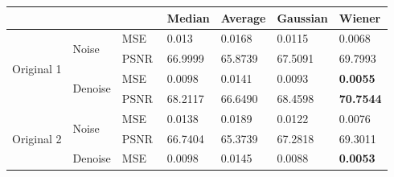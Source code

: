 \begin{center}
\begin{tabular}{llllllllllll|l|l|l|l|l|l|l|l|l|l|l|l|l|}
\cline{13-25}
           &            &            &            &            &            &          &          &       &      &      &     & \multicolumn{3}{l|}{Median}  & \multicolumn{3}{l|}{Average} & \multicolumn{4}{l|}{Gaussian} & \multicolumn{3}{l|}{Wiener}           \\ \hline
\multicolumn{4}{|l|}{\multirow{4}{*}{Original 1}} & \multicolumn{4}{l|}{\multirow{2}{*}{Noise}}   & \multicolumn{4}{l|}{MSE}  & \multicolumn{3}{l|}{0.013}   & \multicolumn{3}{l|}{0.0168}  & \multicolumn{4}{l|}{0.0115}   & \multicolumn{3}{l|}{0.0068}           \\ \cline{9-25} 
\multicolumn{4}{|l|}{}                            & \multicolumn{4}{l|}{}                         & \multicolumn{4}{l|}{PSNR} & \multicolumn{3}{l|}{66.9999} & \multicolumn{3}{l|}{65.8739} & \multicolumn{4}{l|}{67.5091}  & \multicolumn{3}{l|}{69.7993}          \\ \cline{5-25} 
\multicolumn{4}{|l|}{}                            & \multicolumn{4}{l|}{\multirow{2}{*}{Denoise}} & \multicolumn{4}{l|}{MSE}  & \multicolumn{3}{l|}{0.0098}  & \multicolumn{3}{l|}{0.0141}  & \multicolumn{4}{l|}{0.0093}   & \multicolumn{3}{l|}{\textbf{0.0055}}  \\ \cline{9-25} 
\multicolumn{4}{|l|}{}                            & \multicolumn{4}{l|}{}                         & \multicolumn{4}{l|}{PSNR} & \multicolumn{3}{l|}{68.2117} & \multicolumn{3}{l|}{66.6490} & \multicolumn{4}{l|}{68.4598}  & \multicolumn{3}{l|}{\textbf{70.7544}} \\ \hline
\multicolumn{4}{|l|}{\multirow{4}{*}{Original 2}} & \multicolumn{4}{l|}{\multirow{2}{*}{Noise}}   & \multicolumn{4}{l|}{MSE}  & \multicolumn{3}{l|}{0.0138}  & \multicolumn{3}{l|}{0.0189}  & \multicolumn{4}{l|}{0.0122}   & \multicolumn{3}{l|}{0.0076}           \\ \cline{9-25} 
\multicolumn{4}{|l|}{}                            & \multicolumn{4}{l|}{}                         & \multicolumn{4}{l|}{PSNR} & \multicolumn{3}{l|}{66.7404} & \multicolumn{3}{l|}{65.3739} & \multicolumn{4}{l|}{67.2818}  & \multicolumn{3}{l|}{69.3011}          \\ \cline{5-25} 
\multicolumn{4}{|l|}{}                            & \multicolumn{4}{l|}{\multirow{2}{*}{Denoise}} & \multicolumn{4}{l|}{MSE}  & \multicolumn{3}{l|}{0.0098}  & \multicolumn{3}{l|}{0.0145}  & \multicolumn{4}{l|}{0.0088}   & \multicolumn{3}{l|}{\textbf{0.0053}}  \\ \cline{9-25} 

\end{tabular}
\end{center}
